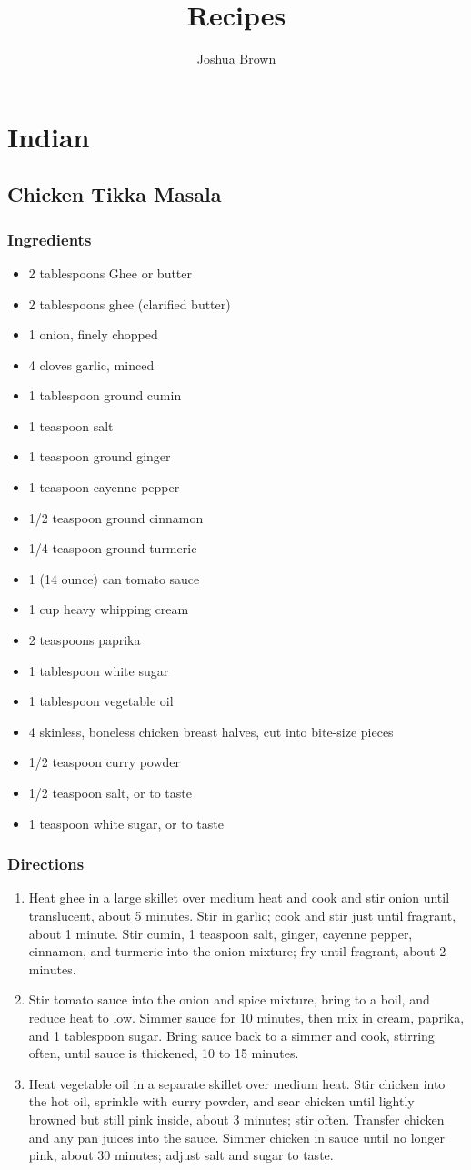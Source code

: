 \documentclass[oneside,11pt]{book}
\title{\bf \Huge Recipes}
\author{Joshua Brown}
\date{}
\newcommand{\Ingredients}[1]{
	\subsection*{Ingredients}
	\begin{itemize} 
	  #1 
	\end{itemize}
}
\newcommand{\Directions}[1]{
	\subsection*{Directions}
	\begin{enumerate} 
	  #1 
	\end{enumerate}
}
\newcommand{\recipe}[1]{
	\section*{ \hspace{-12pt} #1 }
	\addcontentsline{toc}{section}{ \hspace{-6pt} #1 }
}
\begin{document}
\maketitle
\tableofcontents{}

\chapter{Indian}
	\recipe{Chicken Tikka Masala}
		\Ingredients{
			\item 2 tablespoons Ghee or butter
			\item 2 tablespoons ghee (clarified butter)
			\item 1 onion, finely chopped
			\item 4 cloves garlic, minced
			\item 1 tablespoon ground cumin
			\item 1 teaspoon salt
			\item 1 teaspoon ground ginger
			\item 1 teaspoon cayenne pepper
			\item 1/2 teaspoon ground cinnamon
			\item 1/4 teaspoon ground turmeric
			\item 1 (14 ounce) can tomato sauce
			\item 1 cup heavy whipping cream
			\item 2 teaspoons paprika
			\item 1 tablespoon white sugar
			\item 1 tablespoon vegetable oil
			\item 4 skinless, boneless chicken breast halves, cut into bite-size pieces
			\item 1/2 teaspoon curry powder
			\item 1/2 teaspoon salt, or to taste
			\item 1 teaspoon white sugar, or to taste
		}
		
		\Directions{
			\item Heat ghee in a large skillet over medium heat and cook and stir onion until translucent, about 5 minutes. 
			  Stir in garlic; cook and stir just until fragrant, about 1 minute. 
			  Stir cumin, 1 teaspoon salt, ginger, cayenne pepper, cinnamon, and turmeric into the onion mixture; 
			  fry until fragrant, about 2 minutes.
			\item Stir tomato sauce into the onion and spice mixture, bring to a boil, and reduce heat to low.
				Simmer sauce for 10 minutes, then mix in cream, paprika, and 1 tablespoon sugar. 
				Bring sauce back to a simmer and cook, stirring often, until sauce is thickened, 10 to 15 minutes.
			\item Heat vegetable oil in a separate skillet over medium heat. 
			  Stir chicken into the hot oil, sprinkle with curry powder, and sear chicken until lightly browned but still pink inside, about 3 minutes; stir often. 
			  Transfer chicken and any pan juices into the sauce. 
			  Simmer chicken in sauce until no longer pink, about 30 minutes; adjust salt and sugar to taste.
		}
		
\end{document}
